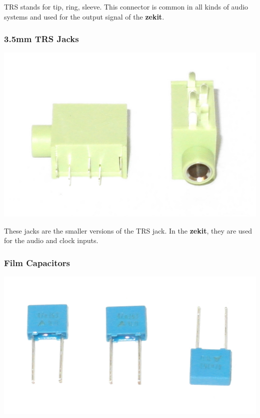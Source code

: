 \documentclass{scrartcl}
\begin{document}
TRS stands for tip, ring, sleeve. This connector is common in all kinds of audio systems and used for the output signal of the \textbf{zekit}.

\subsubsection{3.5mm TRS Jacks}

\begin{center}
    \includegraphics[scale=0.15]{assets/zekit-minijack.jpg}
\end{center}

These jacks are the smaller versions of the TRS jack. In the \textbf{zekit}, they are used for the audio and clock inputs.

\subsubsection{Film Capacitors}

\begin{center}
    \includegraphics[scale=0.15]{assets/zekit-caps.jpg}
\end{center}
\end{document}
